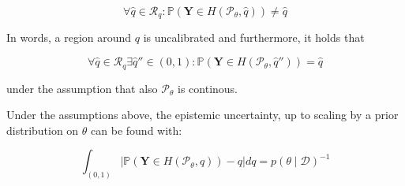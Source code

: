 \begin{equation}
    \forall \hat{q} \in \mathcal{R}_q: \mathbb{P}(\mathbf{Y} \in H(\mathcal{P}_\theta, \hat{q})) \neq \hat{q}
\end{equation}

In words, a region around $q$ is uncalibrated and furthermore, it holds that

\begin{equation}
    \forall \hat{q} \in \mathcal{R}_q \exists \hat{q}'' \in (0,1): \mathbb{P}(\mathbf{Y} \in H(\mathcal{P}_\theta, \hat{q}'')) = \hat{q}
\end{equation}

under the assumption that also $\mathcal{P}_\theta$ is continous.

\begin{theorem}
    Under the assumptions above, the epistemic uncertainty, up to scaling by a prior distribution on $\theta$ can be found with:

    \begin{equation}
        \int_{(0,1)} |\mathbb{P}(\mathbf{Y} \in H(\mathcal{P}_\theta, q)) - q| d q = p(\theta \mid \mathcal{D})^{-1}
        \label{eq:epistemic_uncertainty0}
    \end{equation}
\end{theorem}

